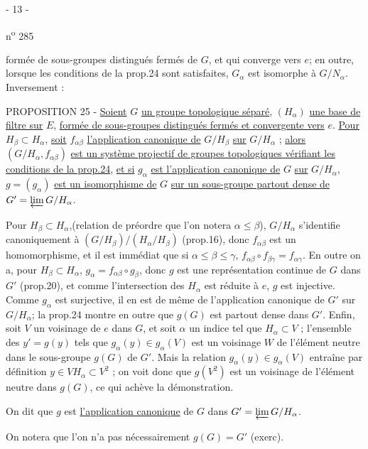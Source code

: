 \begin{center}- 13 -\end{center}
\hfill n\textsuperscript{o} 285

formée de sous-groupes distingués fermés de $G$, et qui converge vers $e$; en outre, lorsque les conditions de la prop.24 sont satisfaites, $G_\alpha$ est isomorphe à $G/N_\alpha$. Inversement :

PROPOSITION 25 - \uline{Soient} $G$ \uline{un groupe topologique séparé}, $(H_\alpha)$ \uline{une base de filtre sur} $E$, \uline{formée de sous-groupes distingués fermés et convergente vers} $e$. \uline{Pour} $H_\beta\subset H_\alpha$, \uline{soit} $f_{\alpha\beta}$ \uline{l'application canonique de} $G/H_\beta$ \uline{sur} $G/H_\alpha$ ; \uline{alors} $(G/H_\alpha,f_{\alpha\beta})$ \uline{est un système projectif de groupes topologiques vérifiant les conditions de la prop.24}, \uline{et si} $g_\alpha$ \uline{est l'application canonique de} $G$ \uline{sur} $G/H_\alpha$, $g=(g_\alpha)$ \uline{est un isomorphisme de} $G$ \uline{sur un sous-groupe partout dense de} $G'=\varprojlim G/H_\alpha$.

Pour $H_\beta\subset H_\alpha$,(relation de préordre que l'on notera $\alpha\leq\beta$), $G/H_\alpha$ s'identifie canoniquement à $(G/H_\beta)/(H_\alpha/H_\beta)$ (prop.16), donc $f_{\alpha\beta}$ est un homomorphisme, et il est immédiat que si $\alpha\leq\beta\leq\gamma$, $f_{\alpha\beta}\circ f_{\beta\gamma}=f_{\alpha\gamma}$. En outre on a, pour $H_\beta\subset H_\alpha$, $g_\alpha=f_{\alpha\beta}\circ g_\beta$, donc $g$ est une représentation continue de $G$ dans $G'$ (prop.20), et comme l'intersection des $H_\alpha$ est réduite à $e$, $g$ est injective. Comme $g_\alpha$ est surjective, il en est de même de l'application canonique de $G'$ sur $G/H_\alpha$; la prop.24 montre en outre que $g(G)$ est partout dense dans $G'$. Enfin, soit $V$ un voisinage de $e$ dans $G$, et soit $\alpha$ un indice tel que $H_\alpha\subset V$ ; l'ensemble des $y'=g(y)$ tels que $g_\alpha(y)\in g_\alpha(V)$ est un voisinage $W$ de l'élément neutre dans le sous-groupe $g(G)$ de $G'$. Mais la relation $g_\alpha(y)\in g_\alpha(V)$ entraîne par définition $y\in VH_\alpha\subset V^2$ ; on voit donc que $g(V^2)$ est un voisinage de l'élément neutre dans $g(G)$, ce qui achève la démonstration.

On dit que $g$ est \uline{l'application canonique} de $G$ dans $G'=\varprojlim G/H_\alpha$.

On notera que l'on n'a pas nécessairement $g(G)=G'$ (exerc).
